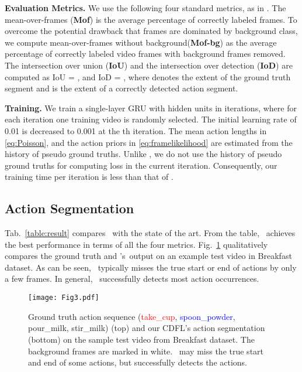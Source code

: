 \documentclass[10pt,twocolumn,letterpaper]{article}
\begin{document}
{\bf  Evaluation  Metrics.} We use the following four standard metrics, as in \cite{bojanowski2014weakly, ding2018weakly}. The mean-over-frames ({\bf Mof}) is the average percentage of correctly labeled frames. To overcome the potential drawback that frames are dominated by background class, we compute mean-over-frames without background({\bf Mof-bg}) as the average percentage of correctly labeled video frames with background frames removed. The intersection over union ({\bf IoU}) and the intersection over detection ({\bf IoD}) are computed as IoU = , and IoD =  , where  denotes the extent of the ground truth segment and  is the extent of a correctly detected action segment.

{\bf Training.} We train a single-layer GRU with 
 hidden units
in  iterations, where for each iteration one training video is randomly selected. The initial learning rate of 0.01 is decreased to 0.001 at the th iteration. The mean action lengths   in \eqref{eq:Poisson},  and the action priors  in \eqref{eq:framelikelihood} are estimated from the history of pseudo ground truths. Unlike \cite{richard2018neuralnetwork}, we do not use the history of pseudo ground truths for computing loss in the current iteration. Consequently, our training time per iteration is less than that of \cite{richard2018neuralnetwork}. 









\subsection{Action Segmentation}
 Tab.~\ref{table:result} compares \abbrmodel\ with the state of the art. From the table,  \abbrmodel\ achieves the best performance in terms of all the four metrics.
Fig.~\ref{fig:prediction} qualitatively compares the ground truth and \abbrmodel's\ output on an example test video in Breakfast dataset.
As can be seen, \abbrmodel\ typically misses the true start or end of actions by only a few frames. In general, \abbrmodel\ successfully detects most action occurrences.

\begin{figure}
\centering
\texttt{[image: Fig3.pdf]}
\caption{Ground truth action sequence (\textcolor{red}{take\_cup}, \textcolor{blue}{spoon\_powder}, \textcolor{mypink}{pour\_milk}, \textcolor{myyellow}{stir\_milk}) (top) and our CDFL's action segmentation (bottom) on the sample test video  from Breakfast dataset. The background frames are marked in white. \abbrmodel\ may miss the true start and end of some actions, but successfully detects the actions.}
\label{fig:prediction}
\end{figure}
\end{document}
